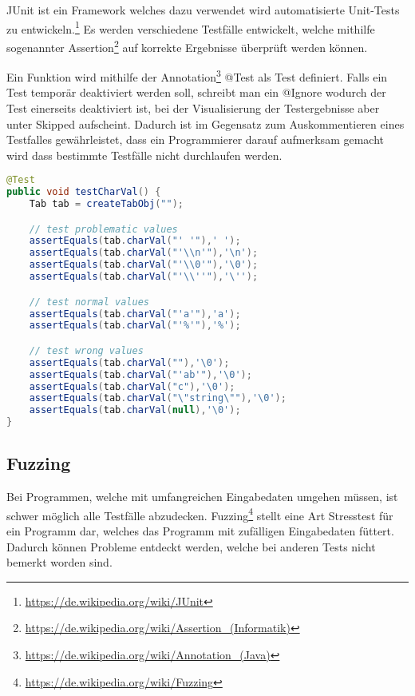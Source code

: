 JUnit ist ein Framework welches dazu verwendet wird automatisierte Unit-Tests zu entwickeln.\footnote{\url{https://de.wikipedia.org/wiki/JUnit}} Es werden verschiedene Testf\"alle entwickelt, welche mithilfe sogenannter Assertion\footnote{\url{https://de.wikipedia.org/wiki/Assertion_(Informatik)}} auf korrekte Ergebnisse \"uberpr\"uft werden k\"onnen.

Ein Funktion wird mithilfe der Annotation\footnote{\url{https://de.wikipedia.org/wiki/Annotation_(Java)}}  @Test als Test definiert. Falls ein Test tempor\"ar deaktiviert werden soll, schreibt man ein @Ignore wodurch der Test einerseits deaktiviert ist, bei der Visualisierung der Testergebnisse aber unter Skipped aufscheint. Dadurch ist im Gegensatz zum Auskommentieren eines Testfalles gew\"ahrleistet, dass ein Programmierer darauf aufmerksam gemacht wird dass bestimmte Testf\"alle nicht durchlaufen werden.

\begin{lstlisting}[language=Java]
@Test
public void testCharVal() {
	Tab tab = createTabObj("");

	// test problematic values
	assertEquals(tab.charVal("' '"),' ');
	assertEquals(tab.charVal("'\\n'"),'\n');
	assertEquals(tab.charVal("'\\0'"),'\0');
	assertEquals(tab.charVal("'\\''"),'\'');

	// test normal values
	assertEquals(tab.charVal("'a'"),'a');
	assertEquals(tab.charVal("'%'"),'%');

	// test wrong values
	assertEquals(tab.charVal(""),'\0');
	assertEquals(tab.charVal("'ab'"),'\0');
	assertEquals(tab.charVal("c"),'\0');
	assertEquals(tab.charVal("\"string\""),'\0');
	assertEquals(tab.charVal(null),'\0');
}
\end{lstlisting}

\subsection{Fuzzing}

Bei Programmen, welche mit umfangreichen Eingabedaten umgehen m\"ussen, ist schwer m\"oglich alle Testf\"alle abzudecken. Fuzzing\footnote{\url{https://de.wikipedia.org/wiki/Fuzzing}} stellt eine Art Stresstest f\"ur ein Programm dar, welches das Programm mit zuf\"alligen Eingabedaten f\"uttert. Dadurch k\"onnen Probleme entdeckt werden, welche bei anderen Tests nicht bemerkt worden sind.

